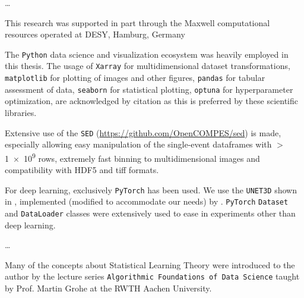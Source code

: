 \dots

This research was supported in part through the Maxwell computational resources operated at \gls{DESY}, Hamburg, Germany

The \texttt{Python} data science and visualization ecosystem was heavily employed in this thesis.
The usage of \texttt{Xarray} \cite{hoyerXarrayNDLabeled2017} for multidimensional dataset transformations, \texttt{matplotlib} \cite{hunterMatplotlib2DGraphics2007} for plotting of images and other figures, \texttt{pandas} \cite{thepandasdevelopmentteamPandasdevPandasPandas2024} for tabular assessment of data, \texttt{seaborn} \cite{waskomSeabornStatisticalData2021} for statistical plotting, \texttt{optuna} \cite{akibaOptunaNextgenerationHyperparameter2019} for hyperparameter optimization, are acknowledged by citation as this is preferred by these scientific libraries. 

Extensive use of the \texttt{SED} (\href{https://github.com/OpenCOMPES/sed}{https://github.com/OpenCOMPES/sed}) is made, especially allowing easy manipulation of the single-event dataframes with $>$\num{1e9} rows, extremely fast binning to multidimensional images and compatibility with \gls{HDF5} and tiff formats.

For deep learning, exclusively \texttt{PyTorch} \cite{paszkePyTorchImperativeStyle2019} has been used. We use the \texttt{UNET3D} shown in \cite{cicek3DUNetLearning2016}, implemented (modified to accommodate our needs) by \citeauthor{wolnyAccurateVersatile3D2020} \cite{wolnyAccurateVersatile3D2020}. \texttt{PyTorch} \texttt{Dataset} and \texttt{DataLoader} classes were extensively used to ease in experiments other than deep learning.


\dots

Many of the concepts about Statistical Learning Theory were introduced to the author by the lecture series \texttt{Algorithmic Foundations of Data Science} taught by Prof. Martin Grohe at the RWTH Aachen University.
